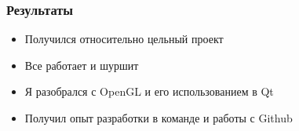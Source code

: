 \begin{frame}\frametitle{Результаты}
    \begin{itemize}
        \item Получился относительно цельный проект
        \item Все работает и шуршит
        \item Я разобрался с OpenGL и его использованием в Qt
        \item Получил опыт разработки в команде и работы с Github
    \end{itemize}
\end{frame}
